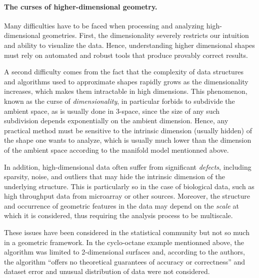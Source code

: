 \paragraph{The curses of higher-dimensional geometry.} 
Many difficulties have to be faced when processing and analyzing
high-dimensional geometries. First, the dimensionality severely restricts our intuition and ability to visualize the data. Hence,  understanding higher dimensional shapes must rely on automated and robust tools that produce provably correct results.

A second difficulty comes from the fact that the complexity of data structures and algorithms used to  approximate shapes  rapidly grows as the dimensionality increases, which makes them intractable in high dimensions.  This phenomenon, known as the curse of {\em dimensionality}, 
in particular forbids to subdivide the ambient space, as is usually done in 3-space, since the size of any such subdivision depends exponentially on the ambient dimension.  Hence, any practical method must be sensitive to the intrinsic dimension (usually hidden) of the shape one wants to analyze, which is usually much lower than the dimension of the ambient space according to the 
manifold model mentionned above.

In addition, high-dimensional data often suffer from significant {\em defects}, including sparsity, noise, and outliers that may hide the intrinsic dimension of the underlying structure. This is particularly so in the case of biological data, such as high throughput data from microarray or other sources. Moreover, the structure and occurrence of geometric features in the data may depend on the {\em scale} at which it is considered, thus requiring the analysis process to be multiscale.  

These issues have been considered in the statistical community but not so much in a geometric framework. In the cyclo-octane example mentionned above, the algorithm was limited to 2-dimensional surfaces and, according to the authors, the algorithm ``offers no theoretical guarantees of accuracy or correctness'' and dataset error and unusual distribution of data were not considered.

